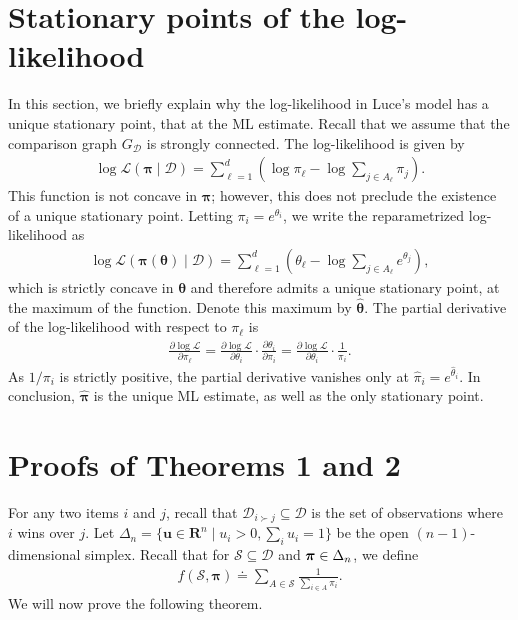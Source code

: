 \newcommand{\D}[2]{\ensuremath{\mathcal{D}_{#1 \succ #2}}}

\section{Stationary points of the log-likelihood}

In this section, we briefly explain why the log-likelihood in Luce's model has a unique stationary point, that at the ML estimate.
Recall that we assume that the comparison graph $G_{\mathcal{D}}$ is strongly connected.
The log-likelihood is given by
\begin{align}
\label{fix:eq:loglik}
\log \mathcal{L}(\bm{\pi} \mid \mathcal{D}) = \sum_{\ell = 1}^d \left( \log \pi_\ell - \log{\sum_{j \in A_\ell} \pi_j} \right).
\end{align}
This function is not concave in $\bm{\pi}$; however, this does not preclude the existence of a unique stationary point.
Letting $\pi_i = e^{\theta_i}$, we write the reparametrized log-likelihood as
\begin{align*}
\log \mathcal{L}(\bm{\pi}(\bm{\theta}) \mid \mathcal{D}) = \sum_{\ell = 1}^d \left( \theta_\ell - \log{\sum_{j \in A_\ell} e^{\theta_j}} \right),
\end{align*}
which is strictly concave in $\bm{\theta}$ and therefore admits a unique stationary point, at the maximum of the function.
Denote this maximum by $\hat{\bm{\theta}}$.
The partial derivative of the log-likelihood with respect to $\pi_\ell$ is
\begin{align}
\frac{\partial \log \mathcal{L}}{\partial \pi_\ell}
  = \frac{\partial \log \mathcal{L}}{\partial \theta_i} \cdot \frac{\partial \theta_i}{\partial \pi_i}
  = \frac{\partial \log \mathcal{L}}{\partial \theta_i} \cdot \frac{1}{\pi_i}.
\end{align}
As $1/\pi_i$ is strictly positive, the partial derivative vanishes only at $\hat{\pi}_i = e^{\hat{\theta}_i}$.
In conclusion, $\hat{\bm{\pi}}$ is the unique ML estimate, as well as the only stationary point.


\section{Proofs of Theorems 1 and 2}


For any two items $i$ and $j$, recall that $\mathcal{D}_{i \succ j} \subseteq \mathcal{D}$ is the set of observations where $i$ wins over $j$.
Let $\Delta_n = \{ \bm{u} \in \mathbf{R}^n \mid u_i > 0, \sum_i u_i = 1 \}$ be the open $(n\!-\!1)$-dimensional simplex.
Recall that for $\mathcal{S} \subseteq \mathcal{D}$ and $\bm{\pi} \in \Delta_n$, we define
\begin{align}
\label{fix:eq:rate}
f(\mathcal{S}, \bm{\pi}) \doteq \sum_{A \in \mathcal{S}} \frac{1}{\sum_{i \in A} \pi_i}.
\end{align}
We will now prove the following theorem.

